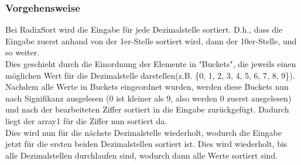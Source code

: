 \documentclass[
../../AuD-Zusammenfassung.tex,
]
{subfiles}
\begin{document}

\subsubsection{Vorgehensweise}
Bei RadixSort wird die Eingabe für jede Dezimalstelle sortiert. D.h., dass die Eingabe zuerst anhand von der 1er-Stelle sortiert wird, dann der 10er-Stelle, und so weiter. \\
Dies geschieht durch die Einordnung der Elemente in "Buckets", die jeweils einen möglichen Wert für die Dezimalstelle darstellen(z.B. \{0, 1, 2, 3, 4, 5, 6, 7, 8, 9\}). Nachdem alle Werte in Buckets eingeordnet wurden, werden diese Buckets nun nach Signifikanz ausgelesen (0 ist kleiner als 9, also werden 0 zuerst ausgelesen) und nach der bearbeiteten Ziffer sortiert in die Eingabe zurückgefügt. Dadurch liegt der array1 für die Ziffer nun sortiert da.\\
Dies wird nun für die nächste Dezimalstelle wiederholt, wodurch die Eingabe jetzt für die ersten beiden Dezimalstellen sortiert ist. Dies wird wiederholt, bis alle Dezimalstellen durchlaufen sind, wodurch dann alle Werte sortiert sind.
\newpage
\end{document}
